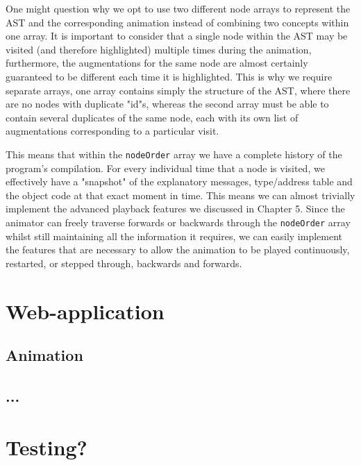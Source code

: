 \documentclass{l4proj}
\begin{document}
One might question why we opt to use two different node arrays to represent the AST and the corresponding animation instead of combining two concepts within one array. It is important to consider that a single node within the AST may be visited (and therefore highlighted) multiple times during the animation, furthermore, the augmentations for the same node are almost certainly guaranteed to be different each time it is highlighted. This is why we require separate arrays, one array contains simply the structure of the AST, where there are no nodes with duplicate "id"s, whereas the second array must be able to contain several duplicates of the same node, each with its own list of augmentations corresponding to a particular visit.

This means that within the \texttt{nodeOrder} array we have a complete history of the program's compilation. For every individual time that a node is visited, we effectively have a "snapshot" of the explanatory messages, type/address table and the object code at that exact moment in time. This means we can almost trivially implement the advanced playback features we discussed in Chapter 5. Since the animator can freely traverse forwards or backwards through the \texttt{nodeOrder} array whilst still maintaining all the information it requires, we can easily implement the features that are necessary to allow the animation to be played continuously, restarted, or stepped through, backwards and forwards.

\section{Web-application}
\subsection{Animation}
\subsection{...}
\section{Testing?}
  

\end{document}
